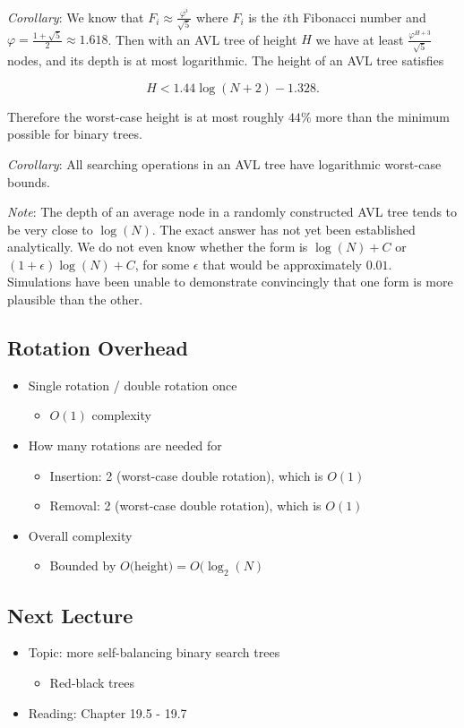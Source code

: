 \documentclass[
  10pt,
  english,
  letterpaper,
,tablecaptionabove
]{scrartcl}
\providecommand{\tightlist}{%
  \setlength{\itemsep}{0pt}\setlength{\parskip}{0pt}}
\begin{document}
\emph{Corollary}: We know that
\(F_i \approx \frac{\varphi^i}{\sqrt{5}}\) where \(F_i\) is the \(i\)th
Fibonacci number and \(\varphi = \frac{1+\sqrt{5}}{2} \approx 1.618\).
Then with an AVL tree of height \(H\) we have at least
\(\frac{\varphi^{H+3}}{\sqrt{5}}\) nodes, and its depth is at most
logarithmic. The height of an AVL tree satisfies

\[H < 1.44 \log(N+2) - 1.328.\]

Therefore the worst-case height is at most roughly \(44\%\) more than
the minimum possible for binary trees.

\emph{Corollary}: All searching operations in an AVL tree have
logarithmic worst-case bounds.

\emph{Note}: The depth of an average node in a randomly constructed AVL
tree tends to be very close to \(\log(N)\). The exact answer has not yet
been established analytically. We do not even know whether the form is
\(\log(N) + C\) or \((1 + \epsilon) \log(N) + C\), for some \(\epsilon\)
that would be approximately \(0.01\). Simulations have been unable to
demonstrate convincingly that one form is more plausible than the other.

\hypertarget{rotation-overhead}{%
\subsection{Rotation Overhead}\label{rotation-overhead}}

\begin{itemize}
\tightlist
\item
  Single rotation / double rotation once

  \begin{itemize}
  \tightlist
  \item
    \(O(1)\) complexity
  \end{itemize}
\item
  How many rotations are needed for

  \begin{itemize}
  \tightlist
  \item
    Insertion: 2 (worst-case double rotation), which is \(O(1)\)
  \item
    Removal: 2 (worst-case double rotation), which is \(O(1)\)
  \end{itemize}
\item
  Overall complexity

  \begin{itemize}
  \tightlist
  \item
    Bounded by \(O(\)height\() = O(\log_2(N)\)
  \end{itemize}
\end{itemize}

\hypertarget{next-lecture}{%
\subsection{Next Lecture}\label{next-lecture}}

\begin{itemize}
\tightlist
\item
  Topic: more self-balancing binary search trees

  \begin{itemize}
  \tightlist
  \item
    Red-black trees
  \end{itemize}
\item
  Reading: Chapter 19.5 - 19.7
\end{itemize}
\end{document}
